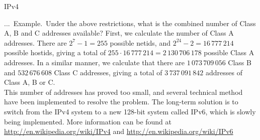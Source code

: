 \documentclass[smaller,hyperref={CJKbookmarks=true}]{beamer}
\newcounter{zhuo}[subsection]
\renewcommand{\thezhuo}{\thesection.\thesubsection.\arabic{zhuo}}
\newenvironment{EXAMPLE}{\stepcounter{zhuo}\alert{\!\thezhuo.~Example.\,}}{}
\begin{document}
\begin{frame}{IPv4}
\begin{spacing}{1.05}
\begin{EXAMPLE}
Under the above restrictions, what is the combined
number of Class A, B and C addresses available?
\end{EXAMPLE}
\newpage
\vspace*{10pt}
First, we calculate the number of Class A addresses. There are $2^7-1=255$ possible netids, and $2^{24}-2=16\,777\,214$ possible hostids, giving a total of $255\cdot16\,777\,214=2\,130\,706\,178$ possible Class A addresses. In a similar manner, we calculate that there are $1\,073\,709\,056$ Class B and $532\,676\,608$ Class C addresses, giving a total  of $3\,737\,091\,842$ addresses of Class A, B or C.\\[6pt]
This number of addresses has proved too small, and several technical
method have been implemented to resolve the problem. The long-term
solution is to switch from the IPv4 system to a new 128-bit system called
IPv6, which is slowly being implemented. More information can be found
at
\href{http://en.wikipedia.org/wiki/IPv4}{\sc http://en.wikipedia.org/wiki/IPv4} and
\href{http://en.wikipedia.org/wiki/IPv6}{\sc http://en.wikipedia.org/wiki/IPv6}
\end{spacing}
\end{frame}
\end{document}
